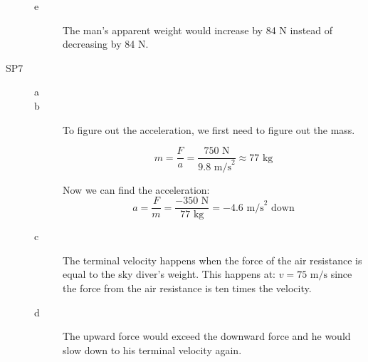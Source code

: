 \documentclass{exam}
\begin{document}
\begin{description}
\begin{description}
\item[e]
The man's apparent weight would increase by 84 N instead of decreasing by 84 N.

\end{description}

\item[SP7]

\begin{description}
\item[a]


\item[b]
To figure out the acceleration, we first need to figure out the mass.

\[
  m = \frac{F}{a} = \frac{750 \text{ N}}{9.8 \text{ m/s}^2} \approx 77 \text{ kg}
\]

Now we can find the acceleration:
\[
  a = \frac{F}{m} = \frac{-350 \text{ N}}{77 \text{ kg}} = -4.6 \text{ m/s}^2 \text{ down}
\]

\item[c]
The terminal velocity happens when the force of the air resistance is equal to the sky diver's weight.  This happens at:
$v = 75 \text{ m/s}$ since the force from the air resistance is ten times the velocity.

\item[d]
The upward force would exceed the downward force and he would slow down to his terminal velocity again. 

\end{description}

\end{description}

\fi




\end{document}

